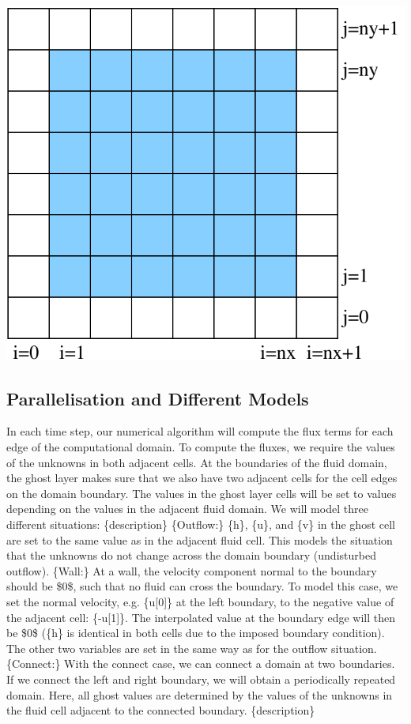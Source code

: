 \begin{DoxyImageNoCaption}
  \mbox{\includegraphics{ghost_cells}}
\end{DoxyImageNoCaption}
 \hypertarget{index_models}{}\subsection{Parallelisation and Different Models}\label{index_models}
In each time step, our numerical algorithm will compute the flux terms for each edge of the computational domain. To compute the fluxes, we require the values of the unknowns in both adjacent cells. At the boundaries of the fluid domain, the ghost layer makes sure that we also have two adjacent cells for the cell edges on the domain boundary. The values in the ghost layer cells will be set to values depending on the values in the adjacent fluid domain. We will model three different situations\-: \{description\} \{Outflow\-:\} \{h\}, \{u\}, and \{v\} in the ghost cell are set to the same value as in the adjacent fluid cell. This models the situation that the unknowns do not change across the domain boundary (undisturbed outflow). \{Wall\-:\} At a wall, the velocity component normal to the boundary should be \$0\$, such that no fluid can cross the boundary. To model this case, we set the normal velocity, e.\-g. \{u\mbox{[}0\mbox{]}\} at the left boundary, to the negative value of the adjacent cell\-: \{-\/u\mbox{[}1\mbox{]}\}. The interpolated value at the boundary edge will then be \$0\$ (\{h\} is identical in both cells due to the imposed boundary condition). The other two variables are set in the same way as for the outflow situation. \{Connect\-:\} With the connect case, we can connect a domain at two boundaries. If we connect the left and right boundary, we will obtain a periodically repeated domain. Here, all ghost values are determined by the values of the unknowns in the fluid cell adjacent to the connected boundary. \{description\}

